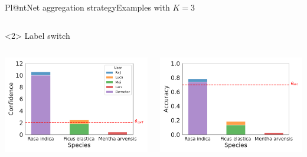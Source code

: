 \begin{frame}{Pl@ntNet aggregation strategy}{Examples with $K=3$}
\begin{onlyenv}
\begin{columns}
\begin{column}{.5\textwidth}
\begin{center}
                \end{center}
            \end{column}
        \end{columns}
    \end{onlyenv}
    \begin{onlyenv}<2>
        Label switch\phantom{g}
        \begin{columns}
            \begin{column}{.5\textwidth}
                \begin{center}
                    \includegraphics[width=\textwidth]{./images/histplot_conf_switch.pdf}
                \end{center}
            \end{column}
            \begin{column}{.5\textwidth}
                \begin{center}
                    \includegraphics[width=\textwidth]{./images/histplot_acc_switch.pdf}

\end{center}
\end{column}
\end{columns}
\end{onlyenv}
\end{frame}
